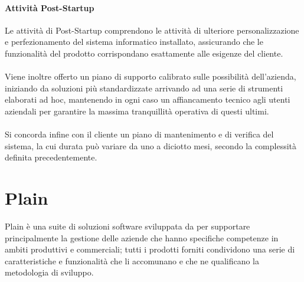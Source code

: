 \paragraph{Attività Post-Startup}
Le attività di Post-Startup comprendono le attività di ulteriore personalizzazione e perfezionamento del sistema informatico installato, assicurando che le funzionalità del prodotto corrispondano esattamente alle esigenze del cliente.
\\\\
Viene inoltre offerto un piano di supporto calibrato sulle possibilità dell'azienda, iniziando da soluzioni più standardizzate arrivando ad una serie di strumenti elaborati ad hoc, mantenendo in ogni caso un affiancamento tecnico agli utenti aziendali per garantire la massima tranquillità operativa di questi ultimi.
\\\\
Si concorda infine con il cliente un piano di mantenimento e di verifica del sistema, la cui durata può variare da uno a diciotto mesi, secondo la complessità definita precedentemente.

\section{Plain}
Plain è una suite di soluzioni software sviluppata da \asi per supportare principalmente la gestione delle aziende che hanno specifiche competenze in ambiti produttivi e commerciali; tutti i prodotti forniti condividono una serie di caratteristiche e funzionalità che li accomunano e che ne qualificano la metodologia di sviluppo.

